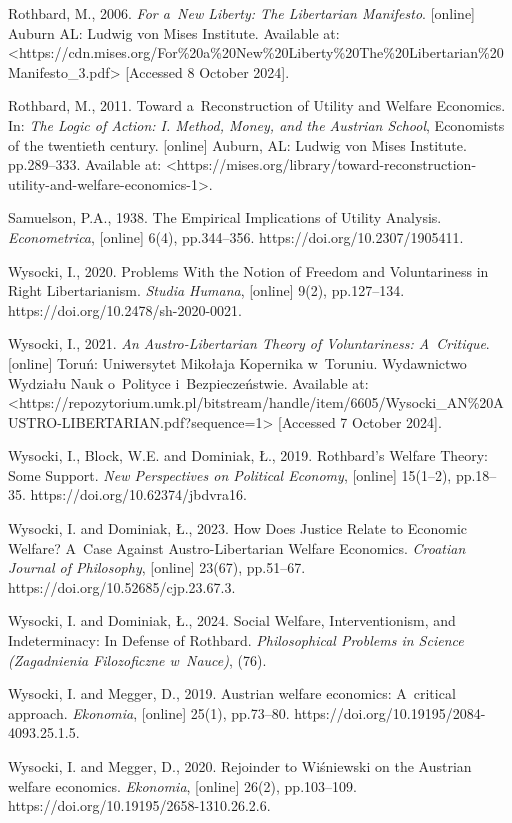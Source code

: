 Rothbard, M., 2006. \textit{For a~New Liberty: The Libertarian Manifesto}. [online] Auburn AL: Ludwig von Mises Institute. Available at: {\textless}https://cdn.mises.org/For\%20a\%20New\%20Liberty\%20The\%20Libertarian\%20Manifesto\_3.pdf{\textgreater} [Accessed 8 October 2024].



Rothbard, M., 2011. Toward a~Reconstruction of Utility and Welfare Economics. In: \textit{The Logic of Action: I. Method, Money, and the Austrian School}, Economists of the twentieth century. [online] Auburn, AL: Ludwig von Mises Institute. pp.289–333. Available at: {\textless}https://mises.org/library/toward-reconstruction-utility-and-welfare-economics-1{\textgreater}.



Samuelson, P.A., 1938. The Empirical Implications of Utility Analysis. \textit{Econometrica}, [online] 6(4), pp.344–356. https://doi.org/10.2307/1905411.



Wysocki, I., 2020. Problems With the Notion of Freedom and Voluntariness in Right Libertarianism. \textit{Studia Humana}, [online] 9(2), pp.127–134. https://doi.org/10.2478/sh-2020-0021.



Wysocki, I., 2021. \textit{An Austro-Libertarian Theory of Voluntariness: A~Critique}. [online] Toruń: Uniwersytet Mikołaja Kopernika w~Toruniu. Wydawnictwo Wydziału Nauk o~Polityce i~Bezpieczeństwie. Available at: {\textless}https://repozytorium.umk.pl/bitstream/handle/item/6605/Wysocki\_AN\%20AUSTRO-LIBERTARIAN.pdf?sequence=1{\textgreater} [Accessed 7 October 2024].



Wysocki, I., Block, W.E. and Dominiak, Ł., 2019. Rothbard's Welfare Theory: Some Support. \textit{New Perspectives on Political Economy}, [online] 15(1–2), pp.18–35. https://doi.org/10.62374/jbdvra16.



Wysocki, I. and Dominiak, Ł., 2023. How Does Justice Relate to Economic Welfare? A~Case Against Austro-Libertarian Welfare Economics. \textit{Croatian Journal of Philosophy}, [online] 23(67), pp.51–67. https://doi.org/10.52685/cjp.23.67.3.



Wysocki, I. and Dominiak, Ł., 2024. Social Welfare, Interventionism, and Indeterminacy: In Defense of Rothbard. \textit{Philosophical Problems in Science (Zagadnienia Filozoficzne w~Nauce)}, (76).



Wysocki, I. and Megger, D., 2019. Austrian welfare economics: A~critical approach. \textit{Ekonomia}, [online] 25(1), pp.73–80. https://doi.org/10.19195/2084-4093.25.1.5.



Wysocki, I. and Megger, D., 2020. Rejoinder to Wiśniewski on the Austrian welfare economics. \textit{Ekonomia}, [online] 26(2), pp.103–109. https://doi.org/10.19195/2658-1310.26.2.6.



